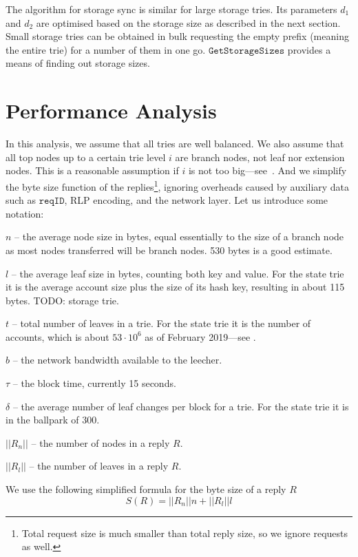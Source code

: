 \documentclass{amsart}
\begin{document}
The algorithm for storage sync is similar for large storage tries.
Its parameters $d_1$ and $d_2$ are optimised based on the storage size as described in the next section.
Small storage tries can be obtained in bulk requesting the empty prefix (meaning the entire trie) for a number of them in one go.
$\texttt{GetStorageSizes}$ provides a means of finding out storage sizes.

\section{Performance Analysis}

In this analysis, we assume that all tries are well balanced.
We also assume that all top nodes up to a certain trie level $i$ are branch nodes, not leaf nor extension nodes.
This is a reasonable assumption if $i$ is not too big---see~\cite{akhunov_1x_workshop_part2}.
And we simplify the byte size function of the replies\footnote{Total
request size is much smaller than total reply size, so we ignore requests as well.},
ignoring overheads caused by auxiliary data such as $\texttt{reqID}$,
RLP encoding, and the network layer.
Let us introduce some notation:

$n$ -- the average node size in bytes,
equal essentially to the size of a branch node as most nodes transferred will be branch nodes.
530 bytes is a good estimate.

$l$ -- the average leaf size in bytes, counting both key and value.
For the state trie it is the average account size plus the size of its hash key,
resulting in about 115 bytes.
TODO: storage trie.

$t$ -- total number of leaves in a trie.
For the state trie it is the number of accounts,
which is about $53 \cdot 10^6$ as of February 2019---see \cite{akhunov_1x_workshop_part2}.

$b$ -- the network bandwidth available to the leecher.

$\tau$ -- the block time, currently 15 seconds.

$\delta$ -- the average number of leaf changes per block for a trie.
For the state trie it is in the ballpark of 300.

$||R_n||$ -- the number of nodes in a reply $R$.

$||R_l||$ -- the number of leaves in a reply $R$.

We use the following simplified formula for the byte size of a reply $R$
\begin{equation}
    S(R) = ||R_n|| n + ||R_l|| l
\end{equation}
\end{document}

